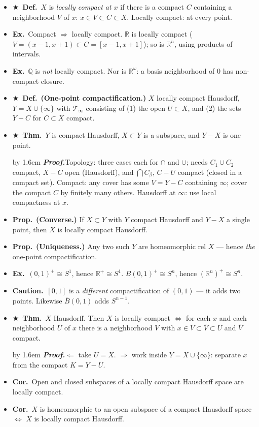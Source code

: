 \documentclass[12pt,a4paper]{article}
\newcommand{\Dfn}{\textbf{Def.}~}
\newcommand{\Thm}{\textbf{Thm.}~}
\newcommand{\Prp}{\textbf{Prop.}~}
\newcommand{\Cor}{\textbf{Cor.}~}
\newcommand{\Exa}{\textbf{Ex.}~}
\newcommand{\Warn}{\textbf{Caution.}~}
\newcommand{\Key}{$\bigstar$~}                  %
\newcommand{\Pf}[1]{%
  \par\addvspace{7pt}\nopagebreak
  \begingroup
    \advance\leftskip by 1.6em
    \parindent=0pt \small\color{prf}%
    \textbf{\textit{Proof.}}\enspace #1\par
  \endgroup
  \addvspace{9pt}}
\newenvironment{BL}%
  {\begin{itemize}[leftmargin=1.4em,labelsep=0.55em,itemsep=11pt,topsep=11pt,parsep=0pt]}%
  {\end{itemize}}
\newcommand{\RR}{\mathbb{R}}
\newcommand{\QQ}{\mathbb{Q}}
\newcommand{\cT}{\mathcal{T}}
\renewcommand{\iff}{\Leftrightarrow}
\newcommand{\imp}{\Rightarrow}
\begin{document}
\begin{BL}
\item \Key\Dfn $X$ is \emph{locally compact at $x$} if there is a compact $C$ containing a
      neighborhood $V$ of $x$: \; $x\in V\subset C\subset X$. Locally compact: at every point.
\item \Exa Compact $\imp$ locally compact. $\RR$ is locally compact ($V=(x-1,x+1)\subset
      C=[x-1,x+1]$); so is $\RR^n$, using products of intervals.
\item \Exa $\QQ$ is \emph{not} locally compact. Nor is $\RR^\omega$: a basis neighborhood of $0$
      has non-compact closure.
\item \Key\Dfn \textbf{(One-point compactification.)} $X$ locally compact Hausdorff,
      $Y=X\cup\{\infty\}$ with $\cT_\infty$ consisting of
      (1) the open $U\subset X$, and
      (2) the sets $Y-C$ for $C\subset X$ compact.
\item \Key\Thm $Y$ is compact Hausdorff, $X\subset Y$ is a subspace, and $Y-X$ is one point.
\Pf{Topology: three cases each for $\cap$ and $\cup$; needs $C_1\cup C_2$ compact, $X-C$ open
(Hausdorff), and $\bigcap C_\beta$, $C-U$ compact (closed in a compact set).
Compact: any cover has some $V=Y-C$ containing $\infty$; cover the compact $C$ by finitely many
others. Hausdorff at $\infty$: use local compactness at $x$.}
\item \Prp \textbf{(Converse.)} If $X\subset Y$ with $Y$ compact Hausdorff and $Y-X$ a single
      point, then $X$ is locally compact Hausdorff.
\item \Prp \textbf{(Uniqueness.)} Any two such $Y$ are homeomorphic rel $X$ ---
      hence \emph{the} one-point compactification.
\item \Exa $(0,1)^{+}\cong S^1$, hence $\RR^{+}\cong S^1$.
      \; $B(0,1)^{+}\cong S^n$, hence $(\RR^n)^{+}\cong S^n$.
\item \Warn $[0,1]$ is a \emph{different} compactification of $(0,1)$ --- it adds two points.
      Likewise $\bar B(0,1)$ adds $S^{n-1}$.
\item \Key\Thm $X$ Hausdorff. Then $X$ is locally compact $\iff$ for each $x$ and each
      neighborhood $U$ of $x$ there is a neighborhood $V$ with
      \(x\in V\subset\bar V\subset U\) and $\bar V$ compact.
\Pf{$\Leftarrow$ take $U=X$. $\imp$ work inside $Y=X\cup\{\infty\}$: separate $x$ from the
compact $K=Y-U$.}
\item \Cor Open and closed subspaces of a locally compact Hausdorff space are locally compact.
\item \Cor $X$ is homeomorphic to an open subspace of a compact Hausdorff space
      $\iff$ $X$ is locally compact Hausdorff.
\end{BL}
\end{document}
